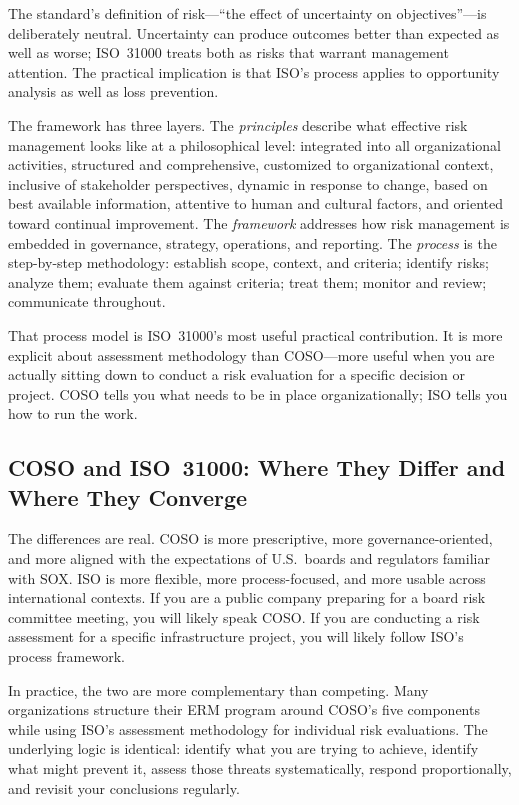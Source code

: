 \documentclass[11pt,openany]{book}
\begin{document}
The standard's definition of risk---``the effect of uncertainty on objectives''---is deliberately neutral. Uncertainty can produce outcomes better than expected as well as worse; ISO~31000 treats both as risks that warrant management attention. The practical implication is that ISO's process applies to opportunity analysis as well as loss prevention.

The framework has three layers. The \emph{principles} describe what effective risk management looks like at a philosophical level: integrated into all organizational activities, structured and comprehensive, customized to organizational context, inclusive of stakeholder perspectives, dynamic in response to change, based on best available information, attentive to human and cultural factors, and oriented toward continual improvement. The \emph{framework} addresses how risk management is embedded in governance, strategy, operations, and reporting. The \emph{process} is the step-by-step methodology: establish scope, context, and criteria; identify risks; analyze them; evaluate them against criteria; treat them; monitor and review; communicate throughout.

That process model is ISO~31000's most useful practical contribution. It is more explicit about assessment methodology than COSO---more useful when you are actually sitting down to conduct a risk evaluation for a specific decision or project. COSO tells you what needs to be in place organizationally; ISO tells you how to run the work.

\subsection{COSO and ISO~31000: Where They Differ and Where They Converge}
\label{subsec:coso-iso-compare}

The differences are real. COSO is more prescriptive, more governance-oriented, and more aligned with the expectations of U.S.\ boards and regulators familiar with SOX. ISO is more flexible, more process-focused, and more usable across international contexts. If you are a public company preparing for a board risk committee meeting, you will likely speak COSO. If you are conducting a risk assessment for a specific infrastructure project, you will likely follow ISO's process framework.

In practice, the two are more complementary than competing. Many organizations structure their ERM program around COSO's five components while using ISO's assessment methodology for individual risk evaluations. The underlying logic is identical: identify what you are trying to achieve, identify what might prevent it, assess those threats systematically, respond proportionally, and revisit your conclusions regularly.
\end{document}
